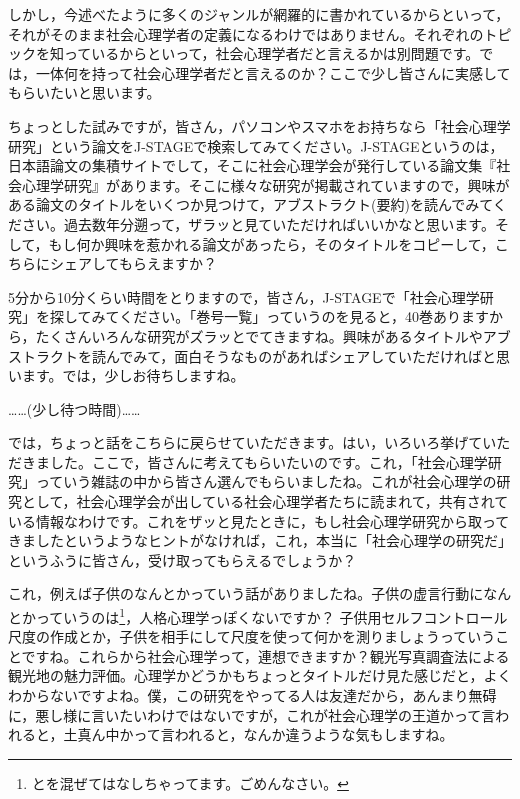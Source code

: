 \documentclass{ltjsbook}
\begin{document}
しかし，今述べたように多くのジャンルが網羅的に書かれているからといって，それがそのまま社会心理学者の定義になるわけではありません。それぞれのトピックを知っているからといって，社会心理学者だと言えるかは別問題です。では，一体何を持って社会心理学者だと言えるのか？ここで少し皆さんに実感してもらいたいと思います。

ちょっとした試みですが，皆さん，パソコンやスマホをお持ちなら「社会心理学研究」という論文をJ-STAGEで検索してみてください。J-STAGEというのは，日本語論文の集積サイトでして，そこに社会心理学会が発行している論文集『社会心理学研究』があります。そこに様々な研究が掲載されていますので，興味がある論文のタイトルをいくつか見つけて，アブストラクト(要約)を読んでみてください。過去数年分遡って，ザラッと見ていただければいいかなと思います。そして，もし何か興味を惹かれる論文があったら，そのタイトルをコピーして，こちらにシェアしてもらえますか？

5分から10分くらい時間をとりますので，皆さん，J-STAGEで「社会心理学研究」を探してみてください。「巻号一覧」っていうのを見ると，40巻ありますから，たくさんいろんな研究がズラッとでてきますね。興味があるタイトルやアブストラクトを読んでみて，面白そうなものがあればシェアしていただければと思います。では，少しお待ちしますね。

……(少し待つ時間)……


では，ちょっと話をこちらに戻らせていただきます。はい，いろいろ挙げていただきました。ここで，皆さんに考えてもらいたいのです。これ，「社会心理学研究」っていう雑誌の中から皆さん選んでもらいましたね。これが社会心理学の研究として，社会心理学会が出している社会心理学者たちに読まれて，共有されている情報なわけです。これをザッと見たときに，もし社会心理学研究から取ってきましたというようなヒントがなければ，これ，本当に「社会心理学の研究だ」というふうに皆さん，受け取ってもらえるでしょうか？

これ，例えば子供のなんとかっていう話がありましたね。子供の虚言行動になんとかっていうのは\footnote{\textcite{KJ00003725146}と\textcite{Asano20232022-006}を混ぜてはなしちゃってます。ごめんなさい。}，人格心理学っぽくないですか？ 子供用セルフコントロール尺度の作成\parencite{Asano20232022-006}とか，子供を相手にして尺度を使って何かを測りましょうっていうことですね。これらから社会心理学って，連想できますか？観光写真調査法による観光地の魅力評価\parencite{Hayashi20191819}。心理学かどうかもちょっとタイトルだけ見た感じだと，よくわからないですよね。僕，この研究をやってる人は友達だから，あんまり無碍に，悪し様に言いたいわけではないですが，これが社会心理学の王道かって言われると，土真ん中かって言われると，なんか違うような気もしますね。
\end{document}

